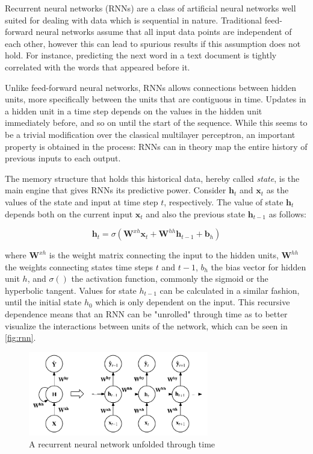 \documentclass{kththesis}
\begin{document}
Recurrent neural networks (RNNs) are a class of artificial neural networks well suited for dealing with data which is sequential in nature. Traditional feed-forward neural networks assume that all input data points are independent of each other, however this can lead to spurious results if this assumption does not hold. For instance, predicting the next word in a text document is tightly correlated with the words that appeared before it. 

Unlike feed-forward neural networks, RNNs allows connections between hidden units, more specifically between the units that are contiguous in time. Updates in a hidden unit in a time step depends on the values in the hidden unit immediately before, and so on until the start of the sequence. While this seems to be a trivial modification over the classical multilayer perceptron, an important property is obtained in the process: RNNs can in theory map the entire history of previous inputs to each output. 

The memory structure that holds this historical data, hereby called \emph{state}, is the main engine that gives RNNs its predictive power. Consider $\mathbf{h}_t$ and $\mathbf{x}_t$ as the values of the state and input at time step $t$, respectively. The value of state $\mathbf{h}_t$ depends both on the current input $\mathbf{x}_t$ and also the previous state $\mathbf{h}_{t-1}$ as follows:

\begin{equation}
\mathbf{h}_t = \sigma(\mathbf{W}^{xh}\mathbf{x}_t + \mathbf{W}^{hh}\mathbf{h}_{t-1} + \mathbf{b}_h)
\end{equation}

where $\mathbf{W}^{xh}$ is the weight matrix connecting the input to the hidden units, $\mathbf{W}^{hh}$ the weights connecting states time steps $t$ and $t-1$, $b_h$ the bias vector for hidden unit $h$, and $\sigma()$ the activation function, commonly the sigmoid or the hyperbolic tangent. Values for state $h_{t-1}$ can be calculated in a similar fashion, until the initial state $h_0$ which is only dependent on the input. This recursive dependence means that an RNN can be "unrolled" through time as to better visualize the interactions between units of the network, which can be seen in \autoref{fig:rnn}.

\begin{figure}[h]
    \centering
    \includegraphics[width=0.7\textwidth,keepaspectratio]{figures/rnn.pdf}
    \caption{A recurrent neural network unfolded through time}
    \label{fig:rnn}
\end{figure}
\end{document}
